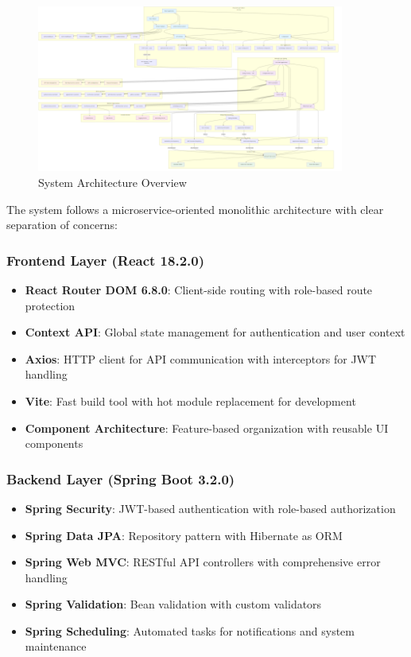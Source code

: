 \documentclass[12pt,a4paper]{article}
\begin{document}
\begin{figure}[H]
\centering
\includegraphics[width=0.9\textwidth]{diagrams/system_architecture}
\caption{System Architecture Overview}
\label{fig:system-architecture}
\end{figure}

The system follows a microservice-oriented monolithic architecture with clear separation of concerns:

\subsubsection{Frontend Layer (React 18.2.0)}
\begin{itemize}
    \item \textbf{React Router DOM 6.8.0}: Client-side routing with role-based route protection
    \item \textbf{Context API}: Global state management for authentication and user context
    \item \textbf{Axios}: HTTP client for API communication with interceptors for JWT handling
    \item \textbf{Vite}: Fast build tool with hot module replacement for development
    \item \textbf{Component Architecture}: Feature-based organization with reusable UI components
\end{itemize}

\subsubsection{Backend Layer (Spring Boot 3.2.0)}
\begin{itemize}
    \item \textbf{Spring Security}: JWT-based authentication with role-based authorization
    \item \textbf{Spring Data JPA}: Repository pattern with Hibernate as ORM
    \item \textbf{Spring Web MVC}: RESTful API controllers with comprehensive error handling
    \item \textbf{Spring Validation}: Bean validation with custom validators
    \item \textbf{Spring Scheduling}: Automated tasks for notifications and system maintenance
\end{itemize}
\end{document}
